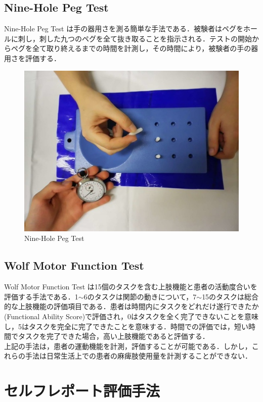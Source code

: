 \subsection*{Nine-Hole Peg Test}
Nine-Hole Peg Test\cite{Mathiowetz1985,Croarkin2004,Sunderland1989}
は手の器用さを測る簡単な手法である．被験者はペグをホールに刺し，刺した九つのペグを全て抜き取ることを指示される．テストの開始からペグを全て取り終えるまでの時間を計測し，その時間により，被験者の手の器用さを評価する．
\begin{figure}[H]
  \centering
  \includegraphics[width=0.8\linewidth]{fig/ch1/nhpt}{}
  \caption{Nine-Hole Peg Test}
  \label{fig:nhpt}
\end{figure}

\subsection*{Wolf Motor Function Test}
Wolf Motor Function Test\cite{Lin2010,Hsieh2009,Shima2009,Nijland2010}
は15個のタスクを含む上肢機能と患者の活動度合いを評価する手法である．1$\sim$6のタスクは関節の動きについて，7$\sim$15のタスクは総合的な上肢機能の評価項目である．患者は時間内にタスクをどれだけ遂行できたか(Functional Ability Score)で評価され，0はタスクを全く完了できないことを意味し，5はタスクを完全に完了できたことを意味する．時間での評価では，短い時間でタスクを完了できた場合，高い上肢機能であると評価する．
\\
上記の手法は，患者の運動機能を計測，評価することが可能である．しかし，これらの手法は日常生活上での患者の麻痺肢使用量を計測することができない．

\section{セルフレポート評価手法}
